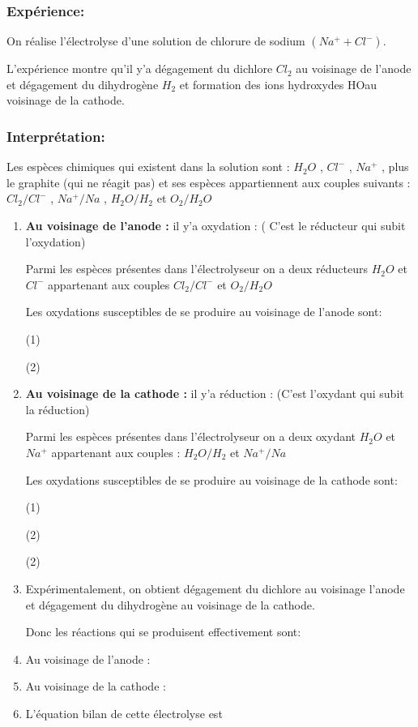 \documentclass[12pt]{article}
\begin{document}
\subsubsection{Expérience:}

On réalise l'électrolyse d'une solution de chlorure de sodium $(Na^++Cl^-)$.

L'expérience montre qu'il y'a dégagement du dichlore $Cl_2$ au voisinage de l'anode et dégagement du dihydrogène $H_2$ et formation
des ions hydroxydes HOau voisinage de la cathode.


\subsubsection{Interprétation: }

Les espèces chimiques qui existent dans la solution sont : $H_2O$ , $Cl^-$ , $Na^+$ , plus le graphite (qui ne réagit pas) et ses espèces appartiennent aux couples suivants : $Cl_2/Cl^-$
, $Na^+/Na$ , $H_2O/H_2$ et $O_2/H_2O$

\begin{enumerate}
	\item \textbf{Au voisinage de l'anode :} il y'a oxydation : ( C'est le réducteur qui subit l'oxydation)

Parmi les espèces présentes dans l'électrolyseur on a deux réducteurs $H_2O$ et $Cl^-$ appartenant aux couples $Cl_2/Cl^-$ et $O_2/H_2O$

Les oxydations susceptibles de se produire au voisinage de l'anode sont:

(1) 

(2) 


\item \textbf{Au voisinage de la cathode :} il y'a réduction : (C'est l'oxydant qui subit la réduction)

Parmi les espèces présentes dans l'électrolyseur on a deux oxydant $H_2O$ et $Na^+$ appartenant aux couples : $H_2O/H_2$ et $Na^+/Na$

Les oxydations susceptibles de se produire au voisinage de la cathode sont:

(1) 

(2) 

(2) 


\item Expérimentalement, on obtient dégagement du dichlore au voisinage l'anode et dégagement du dihydrogène au voisinage de la
cathode.

Donc les réactions qui se produisent effectivement sont:


\item Au voisinage de l'anode : 
\item Au voisinage de la cathode : 

\item L'équation bilan de cette électrolyse est 

\end{enumerate}
\end{document}
